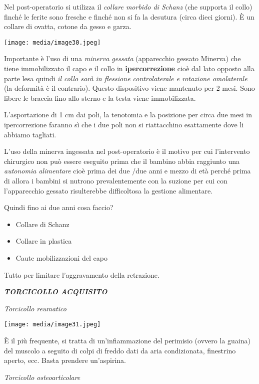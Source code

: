 \documentclass[]{article}
\begin{document}
Nel post-operatorio si utilizza il \emph{collare morbido di Schanz} (che
supporta il collo) finché le ferite sono fresche e finché non si fa la
desutura (circa dieci giorni). È un collare di ovatta, cotone da gesso e
garza.

\texttt{[image: media/image30.jpeg]}

Importante è l'uso di una \emph{minerva gessata} (apparecchio gessato
Minerva) che tiene immobilizzato il capo e il collo in
\textbf{ipercorrezione} cioè dal lato opposto alla parte lesa quindi
\emph{il collo sarà in flessione controlaterale e rotazione omolaterale}
(la deformità è il contrario). Questo dispositivo viene mantenuto per 2
mesi. Sono libere le braccia fino allo sterno e la testa viene
immobilizzata.

L'asportazione di 1 cm dai poli, la tenotomia e la posizione per circa
due mesi in ipercorrezione faranno sì che i due poli non si riattacchino
esattamente dove li abbiamo tagliati.

L'uso della minerva ingessata nel post-operatorio è il motivo per cui
l'intervento chirurgico non può essere eseguito prima che il bambino
abbia raggiunto una \emph{autonomia alimentare} cioè prima dei due /due
anni e mezzo di età perché prima di allora i bambini si nutrono
prevalentemente con la suzione per cui con l'apparecchio gessato
risulterebbe difficoltosa la gestione alimentare.

Quindi fino ai due anni cosa faccio?

\begin{itemize}
\item
  Collare di Schanz
\item
  Collare in plastica
\item
  Caute mobilizzazioni del capo
\end{itemize}

Tutto per limitare l'aggravamento della retrazione.

\emph{\textbf{TORCICOLLO ACQUISITO}}

\emph{Torcicollo reumatico}

\texttt{[image: media/image31.jpeg]}

È il più frequente, si tratta di un'infiammazione del perimisio (ovvero
la guaina) del muscolo a seguito di colpi di freddo dati da aria
condizionata, finestrino aperto, ecc. Basta prendere un'aspirina.

\emph{Torcicollo osteoarticolare}
\end{document}

